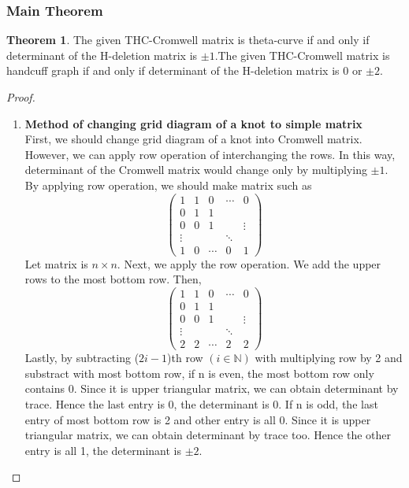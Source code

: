 \documentclass{article}
\theoremstyle{definition}
\theoremstyle{theorem}
\newtheorem{theorem}[thm]{Theorem}
\theoremstyle{proposition}
\theoremstyle{corollary}
\begin{document}
\subsubsection{Main Theorem}
\begin{theorem}The given THC-Cromwell matrix is theta-curve if and only if determinant of the H-deletion matrix is $\pm 1$.The given THC-Cromwell matrix is handcuff graph if and only if determinant of the H-deletion matrix is 0 or $\pm 2$.
\end{theorem}

\begin{proof}
\begin{enumerate}
    \item \textbf{Method of changing grid diagram of a knot to simple matrix}\\
    First, we should change grid diagram of a knot into Cromwell matrix. However, we can apply row operation of interchanging the rows. In this way, determinant of the Cromwell matrix would change only by multiplying $\pm 1$.\\
By applying row operation, we should make matrix such as
    $$\begin{pmatrix} 
    1 & 1 & 0 & \cdots & 0\\
    0 & 1 & 1 &  &  \\
    0 & 0 & 1 & & \vdots\\ 
    \vdots & & & \ddots & \\
    1 & 0 & \cdots & 0 & 1
    \end{pmatrix}$$
Let matrix is $n\times n$.
Next, we apply the row operation. We add the upper rows to the most bottom row. Then,
    $$\begin{pmatrix} 
    1 & 1 & 0 & \cdots & 0\\
    0 & 1 & 1 &  &  \\
    0 & 0 & 1 & & \vdots\\ 
    \vdots & & & \ddots & \\
    2 & 2 & \cdots & 2 & 2
    \end{pmatrix}$$
Lastly, by subtracting ($2i-1$)th row $(i \in \mathbb{N})$ with multiplying row by 2 and substract with most bottom row, if n is even, the most bottom row only contains 0. Since it is upper triangular matrix, we can obtain determinant by trace. Hence the last entry is 0, the determinant is 0. If n is odd, the last entry of most bottom row is 2 and other entry is all 0. Since it is upper triangular matrix, we can obtain determinant by trace too. Hence the other entry is all 1, the determinant is $\pm 2$.\\


\end{enumerate}
\end{proof}
\end{document}

